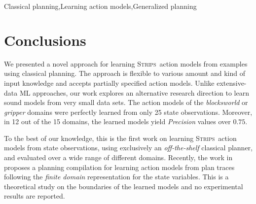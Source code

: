 \documentclass[3p,times]{elsarticle}
\newcommand{\strips}{\textsc{Strips}}     %
\begin{document}
\begin{frontmatter}
\begin{keyword}
Classical planning\sep Learning action models\sep Generalized planning

\end{keyword}

\end{frontmatter}


















\section{Conclusions}
\label{sec:conclusions}
We presented a novel approach for learning \strips\ action models from examples using classical planning. The approach is flexible to various amount and kind of input knowledge and accepts partially specified action models. Unlike extensive-data ML approaches, our work explores an alternative research direction to learn sound models from very small data sets. The action models of the {\em blocksworld} or {\em gripper} domains were perfectly learned from only 25 state observations. Moreover, in 12 out of the 15 domains, the learned models yield {\em Precision} values over $0.75$.

To the best of our knowledge, this is the first work on learning \strips\ action models from state observations, using exclusively an {\em off-the-shelf} classical planner, and evaluated over a wide range of different domains. Recently, the work in~\cite{SternJ17} proposes a planning compilation for learning action models from plan traces following the {\em finite domain} representation for the state variables. This is a theoretical study on the boundaries of the learned models and no experimental results are reported.
\end{document}
